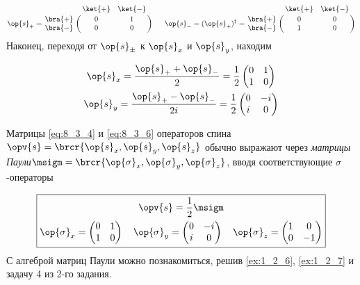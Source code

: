 \begin{equation}
\label{eq:8_3_5}
\op{s}_{+} = 
	\bordermatrix{
            & \ket{+} & \ket{-} \cr
\bra{+} &  0         & 1        \cr
\bra{-}  &  0         & 0       \cr}
~~~~~\op{s}_{-} = (\op{s}_{+})^\dag = 
	\bordermatrix{
            & \ket{+} & \ket{-} \cr
\bra{+} &  0         & 0        \cr
\bra{-}  &  1         & 0       \cr}
\end{equation}%
%
Наконец, переходя от $\op{s}_{\pm}$ к $\op{s}_x$ и $\op{s}_y$, находим

\begin{equation}
\label{eq:8_3_6}
\begin{gathered}
\op{s}_x = \frac{\op{s}_{+} + \op{s}_{-}}{2} = \frac{1}{2} \left (
  \begin{matrix}
  0 & 1 \\
  1 & 0 
  \end{matrix}
\right )
\\
\op{s}_y = \frac{\op{s}_{+} - \op{s}_{-}}{2i} = \frac{1}{2} \left (
  \begin{matrix}
  0 & -i \\
  i & 0 
  \end{matrix}
\right )
\end{gathered}
\end{equation}

Матрицы \eqref{eq:8_3_4} и \eqref{eq:8_3_6} операторов спина $\opv{s} = \brcr{\op{s}_x, \op{s}_y, \op{s}_z}$ обычно выражают через {\em матрицы Паули}\footnotemark $\msigm = \brcr{\op{\sigma}_x, \op{\sigma}_y, \op{\sigma}_z}$, вводя соответствующие $\sigma$-операторы

$$
\boxed{
\begin{gathered}
  \opv{s}= \frac{1}{2}\msigm\\
  \op{\sigma}_x = \left (
    \begin{matrix}
    0 & 1 \\
    1 & 0 
    \end{matrix}
  \right )
  ~~~
  \op{\sigma}_y = \left (
    \begin{matrix}
    0 & -i \\
    i & 0 
    \end{matrix}
  \right )
  ~~~
  \op{\sigma}_z = \left (
    \begin{matrix}
    1 & 0 \\
    0 & -1 
    \end{matrix}
  \right)
\end{gathered}
}
$$%
%
С алгеброй матриц Паули можно познакомиться, решив \cref{ex:1_2_6}, \cref{ex:1_2_7} и задачу 4 из 2-го задания.

